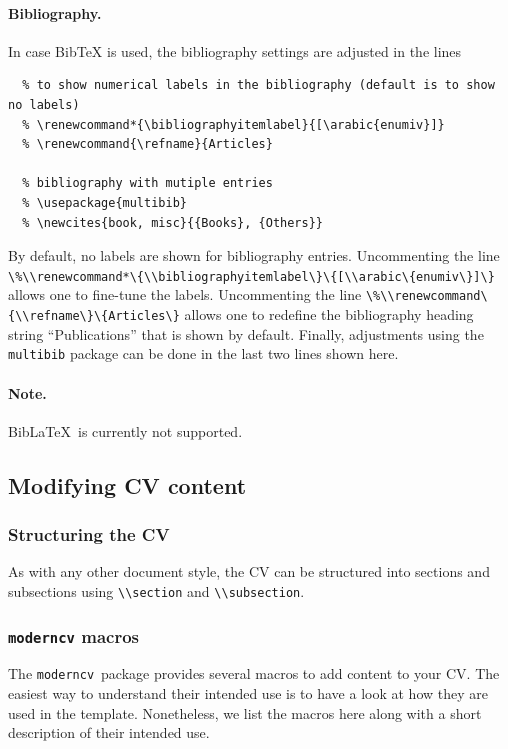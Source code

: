 \documentclass[a4paper, 11pt]{article}
\newcommand{\code}[1]{\lstinline!#1!}
\newcommand{\moderncv}{\code{moderncv}}
\newcommand{\Moderncv}{\moderncv~}
\newcommand{\biblatex}{BibLaTeX}
\newcommand{\Biblatex}{\biblatex~}
\begin{document}
\paragraph{Bibliography.}
In case BibTeX is used, the bibliography settings are adjusted in the lines
\begin{lstlisting}
  % to show numerical labels in the bibliography (default is to show no labels)
  % \renewcommand*{\bibliographyitemlabel}{[\arabic{enumiv}]}
  % \renewcommand{\refname}{Articles}

  % bibliography with mutiple entries
  % \usepackage{multibib}
  % \newcites{book, misc}{{Books}, {Others}}
\end{lstlisting}
By default, no labels are shown for bibliography entries.
Uncommenting the line \code{\%\\renewcommand*\{\\bibliographyitemlabel\}\{[\\arabic\{enumiv\}]\}}
allows one to fine-tune the labels.
Uncommenting the line \code{\%\\renewcommand\{\\refname\}\{Articles\}} allows one to redefine the bibliography heading string ``Publications'' that is shown by default.
Finally, adjustments using the \code{multibib} package can be done in the last two lines shown here.

\paragraph{Note.} \Biblatex is currently not supported.

\subsection{Modifying CV content}
\subsubsection{Structuring the CV}
As with any other document style, the CV can be structured into sections and subsections using \code{\\section} and \code{\\subsection}.

\subsubsection{\texttt{moderncv} macros}

The \Moderncv package provides several macros to add content to your CV.
The easiest way to understand their intended use is to have a look at how they are used in the template.
Nonetheless, we list the macros here along with a short description of their intended use.
\end{document}

